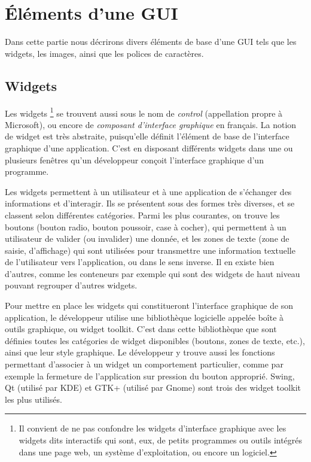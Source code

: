 \section{Éléments d'une GUI}
Dans cette partie nous décrirons divers éléments de base d'une GUI tels que les widgets, les images, ainsi que les polices de caractères.
\subsection{Widgets}

Les widgets%
\footnote{Il convient de ne pas confondre les widgets d'interface graphique
avec les widgets dits interactifs qui sont, eux, de petits programmes
ou outils intégrés dans une page web, un système d'exploitation, ou
encore un logiciel.%
} se trouvent aussi sous le nom de \textit{control} (appellation propre
à Microsoft), ou encore de \textit{composant d'interface graphique}
en français. La notion de widget est très abstraite, puisqu'elle définit
l'élément de base de l'interface graphique d'une application. C'est
en disposant différents widgets dans une ou plusieurs fenêtres qu'un
développeur conçoit l'interface graphique d'un programme. 

Les widgets permettent à un utilisateur et à une application de s'échanger
des informations et d'interagir. Ils se présentent sous des formes
très diverses, et se classent selon différentes catégories. Parmi
les plus courantes, on trouve les boutons (bouton radio, bouton poussoir,
case à cocher), qui permettent à un utilisateur de valider (ou invalider)
une donnée, et les zones de texte (zone de saisie, d'affichage) qui
sont utilisées pour transmettre une information textuelle de l'utilisateur
vers l'application, ou dans le sens inverse. Il en existe bien d'autres,
comme les conteneurs par exemple qui sont des widgets de haut niveau
pouvant regrouper d'autres widgets.

Pour mettre en place les widgets qui constitueront l'interface graphique
de son application, le développeur utilise une bibliothèque logicielle
appelée boîte à outils graphique, ou widget toolkit. C'est dans cette
bibliothèque que sont définies toutes les catégories de widget disponibles
(boutons, zones de texte, etc.), ainsi que leur style graphique. Le
développeur y trouve aussi les fonctions permettant d'associer à
un widget un comportement particulier, comme par exemple la fermeture
de l'application sur pression du bouton approprié. Swing, Qt (utilisé par KDE) et GTK+
(utilisé par Gnome) sont trois des widget toolkit les plus utilisés.

